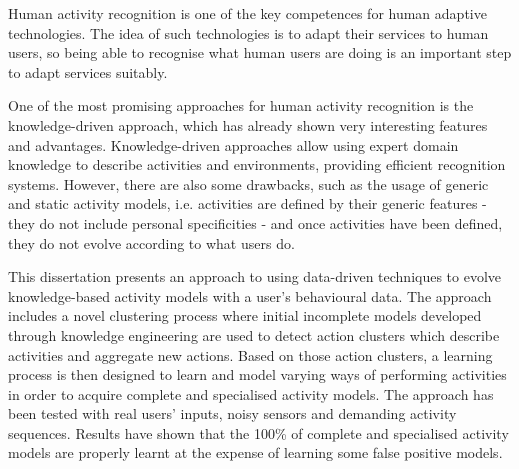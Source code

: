 




\begin{abstracts}        %

Human activity recognition is one of the key competences for human adaptive technologies. The idea of such technologies is to adapt their services to human users, so being able to recognise what human users are doing is an important step to adapt services suitably. 

One of the most promising approaches for human activity recognition is the knowledge-driven approach, which has already shown very interesting features and advantages. Knowledge-driven approaches allow using expert domain knowledge to describe activities and environments, providing efficient recognition systems. However, there are also some drawbacks, such as the usage of generic and static activity models, i.e. activities are defined by their generic features - they do not include personal specificities - and once activities have been defined, they do not evolve according to what users do.

This dissertation presents an approach to using data-driven techniques to evolve knowledge-based activity models with a user's behavioural data. The approach includes a novel clustering process where initial incomplete models developed through knowledge engineering are used to detect action clusters which describe activities and aggregate new actions. Based on those action clusters, a learning process is then designed to learn and model varying ways of performing activities in order to acquire complete and specialised activity models. The approach has been tested with real users' inputs, noisy sensors and demanding activity sequences. Results have shown that the 100\% of complete and specialised activity models are properly learnt at the expense of learning some false positive models.

\end{abstracts}

